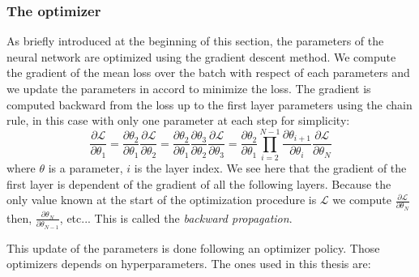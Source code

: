 \documentclass[../main.tex]{subfiles}
\begin{document}
\subsubsection{The optimizer}
\label{sec:ml:optim}

As briefly introduced at the beginning of this section, the parameters of the neural network are optimized using the gradient descent method. We compute the gradient of the mean loss over the batch with respect of each parameters and we update the parameters in accord to minimize the loss. The  gradient is computed backward from the loss up to the first layer parameters using the chain rule, in this case with only one parameter at each step for simplicity:
\begin{equation}
  \label{eq:ml:backward}
  \frac{\partial \mathcal{L}}{\partial \theta_1} = \frac{\partial \theta_2}{\partial \theta_1} \frac{\partial \mathcal{L}}{\partial \theta_2} = \frac{\partial \theta_2}{\partial \theta_1} \frac{\partial \theta_3}{\partial \theta_2} \frac{\partial \mathcal{L}}{\partial \theta_3} = \frac{\partial \theta_2}{\partial \theta_1} \prod_{i=2}^{N-1} \frac{\partial \theta_{i+1}}{\partial \theta_i} \frac{\partial \mathcal{L}}{\partial \theta_N}
\end{equation}
where $\theta$ is a parameter, $i$ is the layer index. We see here that the gradient of the first layer is dependent of the gradient of all the following layers. Because the only value known at the start of the optimization procedure is $\mathcal{L}$ we compute $\frac{\partial \mathcal{L}}{\partial \theta_N}$ then, $\frac{\partial \theta_{N}}{\partial \theta_{N-1}}$, etc... This is called the \textit{backward propagation}.

This update of the parameters is done following an optimizer policy. Those optimizers depends on hyperparameters. The ones used in this thesis are:
\end{document}
